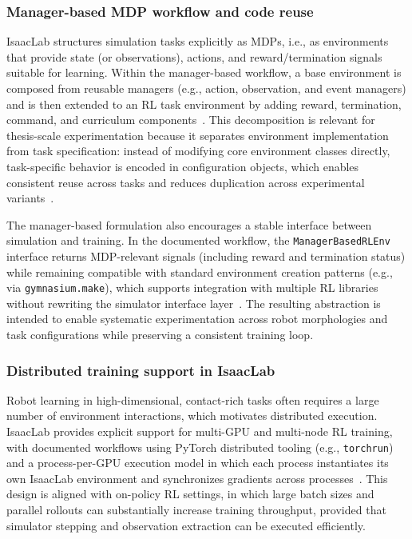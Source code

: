 \subsubsection{Manager-based \ac{MDP} workflow and code reuse}
IsaacLab structures simulation tasks explicitly as \acp{MDP}, i.e., as environments that provide state (or observations), actions, and reward/termination signals suitable for learning. Within the manager-based workflow, a base environment is composed from reusable managers (e.g., action, observation, and event managers) and is then extended to an \ac{RL} task environment by adding reward, termination, command, and curriculum components~\cite{isaaclab_manager_based_rl_env}. This decomposition is relevant for thesis-scale experimentation because it separates environment implementation from task specification: instead of modifying core environment classes directly, task-specific behavior is encoded in configuration objects, which enables consistent reuse across tasks and reduces duplication across experimental variants~\cite{isaaclab_manager_based_rl_env}.

The manager-based formulation also encourages a stable interface between simulation and training. In the documented workflow, the \texttt{ManagerBasedRLEnv} interface returns \ac{MDP}-relevant signals (including reward and termination status) while remaining compatible with standard environment creation patterns (e.g., via \texttt{gymnasium.make}), which supports integration with multiple \ac{RL} libraries without rewriting the simulator interface layer~\cite{isaaclab_manager_based_rl_env}. The resulting abstraction is intended to enable systematic experimentation across robot morphologies and task configurations while preserving a consistent training loop.

\subsubsection{Distributed training support in IsaacLab}
Robot learning in high-dimensional, contact-rich tasks often requires a large number of environment interactions, which motivates distributed execution. IsaacLab provides explicit support for multi-\ac{GPU} and multi-node \ac{RL} training, with documented workflows using PyTorch distributed tooling (e.g., \texttt{torchrun}) and a process-per-\ac{GPU} execution model in which each process instantiates its own IsaacLab environment and synchronizes gradients across processes~\cite{isaaclab_multi_gpu_multinode}. This design is aligned with on-policy \ac{RL} settings, in which large batch sizes and parallel rollouts can substantially increase training throughput, provided that simulator stepping and observation extraction can be executed efficiently.

